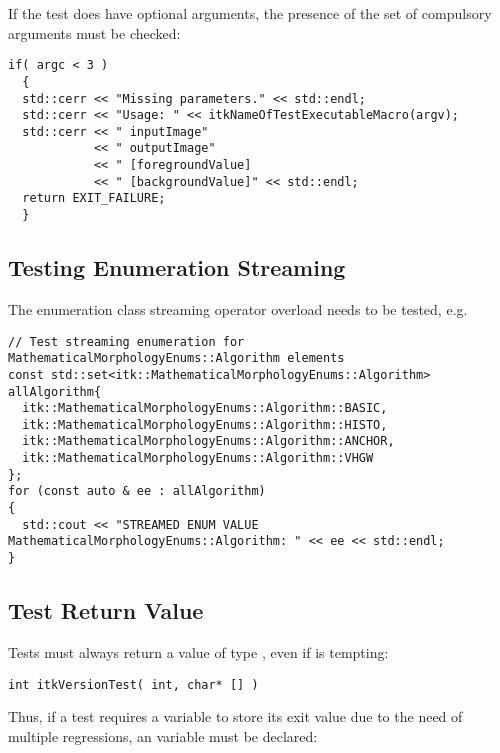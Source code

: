 If the test does have optional arguments, the presence of the set of compulsory
arguments must be checked:

\small
\begin{verbatim}
if( argc < 3 )
  {
  std::cerr << "Missing parameters." << std::endl;
  std::cerr << "Usage: " << itkNameOfTestExecutableMacro(argv);
  std::cerr << " inputImage"
            << " outputImage"
            << " [foregroundValue]
            << " [backgroundValue]" << std::endl;
  return EXIT_FAILURE;
  }
\end{verbatim}
\normalsize


\subsection{Testing Enumeration Streaming}
\label{subsec:TestEnumStreaming}

The enumeration class streaming operator overload needs to be tested, e.g.
\small
\begin{verbatim}
// Test streaming enumeration for MathematicalMorphologyEnums::Algorithm elements
const std::set<itk::MathematicalMorphologyEnums::Algorithm> allAlgorithm{
  itk::MathematicalMorphologyEnums::Algorithm::BASIC,
  itk::MathematicalMorphologyEnums::Algorithm::HISTO,
  itk::MathematicalMorphologyEnums::Algorithm::ANCHOR,
  itk::MathematicalMorphologyEnums::Algorithm::VHGW
};
for (const auto & ee : allAlgorithm)
{
  std::cout << "STREAMED ENUM VALUE MathematicalMorphologyEnums::Algorithm: " << ee << std::endl;
}
\end{verbatim}
\normalsize


\subsection{Test Return Value}
\label{subsec:TestReturnValue}

Tests must always return a value of type ,
even if  is tempting:

\small
\begin{verbatim}
int itkVersionTest( int, char* [] )
\end{verbatim}
\normalsize

Thus, if a test requires a variable to store its exit value due to the need
of multiple regressions, an  variable must be declared:

